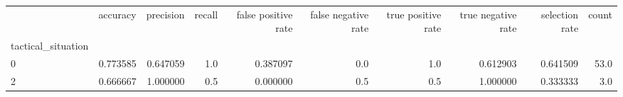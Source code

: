 \begin{tabular}{lrrrrrrrrr}
\toprule
{} &  accuracy &  precision &  recall &  false positive rate &  false negative rate &  true positive rate &  true negative rate &  selection rate &  count \\
tactical\_situation &           &            &         &                      &                      &                     &                     &                 &        \\
\midrule
0                  &  0.773585 &   0.647059 &     1.0 &             0.387097 &                  0.0 &                 1.0 &            0.612903 &        0.641509 &   53.0 \\
2                  &  0.666667 &   1.000000 &     0.5 &             0.000000 &                  0.5 &                 0.5 &            1.000000 &        0.333333 &    3.0 \\
\bottomrule
\end{tabular}
